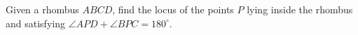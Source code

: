 Given a rhombus $ABCD$,  find the locus of the points $P$ lying inside the rhombus and satisfying $\angle APD+\angle BPC=180^{\circ}$.